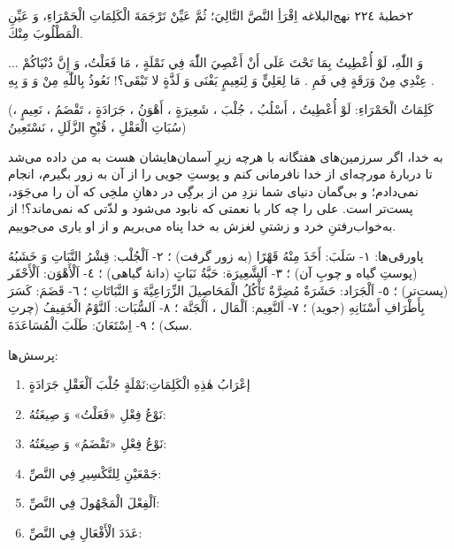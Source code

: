 \begin{JTamrin}{٢}{خطبهٔ ٢٢٤ نهج‌البلاغه}
اِقْرَأِ النَّصَّ التَّالِيَ؛ ثُمَّ عَيِّنْ تَرْجَمَةَ الْكَلِمَاتِ
الْحَمْرَاءِ، وَ عَيِّنِ الْمَطْلُوبَ مِنْكَ.

\begin{JNass}[اَلْخُطْبَةُ الْمِئَتَانِ وَ الرَّابِعَةُ وَ الْعِشْرُونَ
مِنْ نَهْجِ الْبَلَاغَة]
\Ar ... وَ اللّٰهِ، لَوْ أُعْطِيتُ  بِمَا تَحْتَ
 عَلَى أَنْ أَعْصِيَ اللّٰهَ فِي نَمْلَةٍ 
 ، مَا فَعَلْتُ، وَ إِنَّ دُنْيَاكُمْ عِنْدِي
 مِنْ وَرَقَةٍ فِي فَمِ  . مَا
لِعَلِيٍّ وَ لِنَعِيمٍ يَفْنَى وَ لَذَّةٍ لا تَبْقَى؟! نَعُوذُ بِاللّٰهِ مِنْ
 وَ  وَ بِهِ .

(كَلِمَاتُ الْحَمْرَاءِ: لَوْ أُعْطِيتُ ، أَسْلُبُ ، جُلْبَ ، شَعِيرَةٍ ،
أَهْوَنُ ، جَرَادَةٍ ، تَقْضَمُ ، نَعِيمٍ ، سُبَاتِ الْعَقْلِ ، قُبْحِ
الزَّلَلِ ، نَسْتَعِينُ)
\end{JNass}

\begin{JTarjome}
به خدا، اگر سرزمین‌های هفتگانه با هرچه زیرِ آسمان‌هایشان هست به من داده می‌شد
تا دربارهٔ مورچه‌ای از خدا نافرمانی کنم و پوستِ جویی را از آن به زور بگیرم،
انجام نمی‌دادم؛ و بی‌گمان دنیای شما نزدِ من از برگِی در دهانِ ملخِی که آن را
می‌جَوَد، پست‌تر است. علی را چه کار با نعمتی که نابود می‌شود و لذّتی که
نمی‌ماند؟! از به‌خواب‌رفتنِ خرد و زشتیِ لغزش به خدا پناه می‌بریم و از او یاری
می‌جوییم.
\end{JTarjome}

پاورقی‌ها: ١- سَلَبَ: أَخَذَ مِنْهُ قَهْرًا (به زور گرفت) ؛ ٢- اَلْجُلْب:
قِشْرُ النَّبَاتِ وَ خَشَبُهُ (پوستِ گیاه و چوبِ آن) ؛ ٣- اَلشَّعِيرَة:
حَبَّةُ نَبَاتٍ (دانهٔ گیاهی) ؛ ٤- اَلْأَهْوَن: اَلْأَحْقَر (پست‌تر) ؛
٥- اَلْجَرَاد: حَشَرَةٌ مُضِرَّةٌ تَأْكُلُ الْمَحَاصِيلَ الزِّرَاعِيَّةَ وَ
النَّبَاتَاتِ ؛ ٦- قَضَمَ: كَسَرَ بِأَطْرَافِ أَسْنَانِهِ (جوید) ؛
٧- اَلنَّعِيم: اَلْمَال ، اَلْجَنَّة ؛ ٨- اَلسُّبَات: اَلنَّوْمُ
الْخَفِيفُ (چرتِ سبک) ؛ ٩- اِسْتَعَانَ: طَلَبَ الْمُسَاعَدَةَ.

پرسش‌ها:
\begin{enumerate}
  \item إعْرَابُ هٰذِهِ الْكَلِمَاتِ:\quad نَمْلَةٍ \JdotsW{2.6cm} جُلْبَ
        \JdotsW{2.6cm} اَلْعَقْلِ \JdotsW{2.6cm} جَرَادَةٍ \JdotsW{2.6cm}
  \item نَوْعُ فِعْلِ «فَعَلْتُ» وَ صِيغَتُهُ: \JdotsW{6cm}
  \item نَوْعُ فِعْلِ «تَقْضَمُ» وَ صِيغَتُهُ: \JdotsW{6cm}
  \item جَمْعَيْنِ لِلتَّكْسِيرِ فِي النَّصِّ: \JdotsW{6cm}
  \item اَلْفِعْلَ الْمَجْهُولَ فِي النَّصِّ: \JdotsW{6cm}
  \item عَدَدَ الْأَفْعَالِ فِي النَّصِّ: \JdotsW{6cm}
\end{enumerate}
\end{JTamrin}


